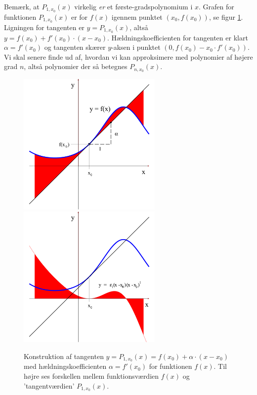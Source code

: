 \begin{aha}
Bemærk, at $P_{1, x_{0}}(x)$ virkelig \emph{er} et første-gradspolynomium i $x$.
Grafen for funktionen $P_{1, x_{0}}(x)$ er  for $f(x)$ igennem punktet $(x_{0}, f(x_{0}))$, se figur \ref{tn14.figP1}. Ligningen for tangenten er $y = P_{1, x_{0}}(x)$, altså $y = f(x_{0}) + f'(x_{0})\cdot(x-x_{0})$. Hældningskoefficienten for tangenten er klart
$\alpha = f'(x_{0})$ og tangenten skærer $y$-aksen i punktet $(0, f(x_{0})-x_{0}\cdot f'(x_{0}))$. Vi skal senere finde ud af, hvordan vi kan approksimere med polynomier af højere grad $n$, altså polynomier der så betegnes $P_{n, x_{0}}(x)$.
\end{aha}

\begin{figure}[h]
\centerline{\includegraphics[height=70mm]{FIGS/plotEpsilon1.pdf}\qquad \includegraphics[height=70mm]{FIGS/plotEpsilon1Pur.pdf}}
\begin{center}
\caption{Konstruktion af tangenten $y = P_{1, x_{0}}(x) = f(x_{0}) +  \alpha\cdot(x-x_{0})$ med hældningskoefficienten $\alpha = f'(x_{0})$ for funktionen $f(x)$. Til højre ses forskellen mellem funktionsværdien $f(x)$ og 'tangentværdien' $P_{1, x_{0}}(x)$.} \label{tn14.figP1}
\end{center}
\end{figure}


